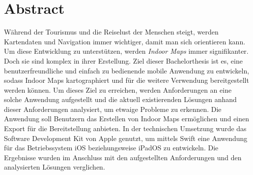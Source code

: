 \chapter*{Abstract}
Während der Tourismus und die Reiselust der Menschen steigt, werden Kartendaten und Navigation immer wichtiger, damit man sich orientieren kann.
Um diese Entwicklung zu unterstützen, werden \emph{Indoor Maps} immer signifikanter.
Doch sie sind komplex in ihrer Erstellung.\pbreak%
%
Ziel dieser Bachelorthesis ist es, eine benutzerfreundliche und einfach zu bedienende mobile Anwendung zu entwickeln, sodass Indoor Maps kartographiert und für die weitere Verwendung bereitgestellt werden können.
Um dieses Ziel zu erreichen, werden Anforderungen an eine solche Anwendung aufgestellt und die aktuell existierenden Lösungen anhand dieser Anforderungen analysiert, um etwaige Probleme zu erkennen.\pbreak%
%
Die Anwendung soll Benutzern das Erstellen von Indoor Maps ermöglichen und einen Export für die Bereitstellung anbieten.
In der technischen Umsetzung wurde das Software Development Kit von Apple genutzt, um mittels Swift eine Anwendung für das Betriebssystem iOS beziehungsweise iPadOS zu entwickeln.
Die Ergebnisse wurden im Anschluss mit den aufgestellten Anforderungen und den analysierten Lösungen verglichen.
\clearpage
